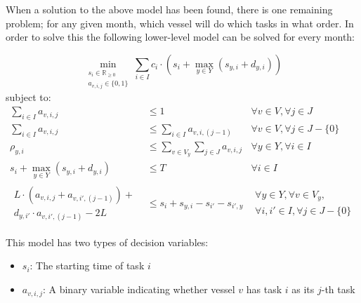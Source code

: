 \documentclass[a4paper,12pt]{article}
\begin{document}
When a solution to the above model has been found, there is one remaining problem; for any given month, which vessel will do which tasks in what order. In order to solve this the following lower-level model can be solved for every month:

\begin{adjustwidth}{-2.5cm}{-2.5cm}
\begin{equation}
	\min_{\substack{s_i \in \mathbb{R}_{\geq 0} \\ 
	a_{v,i,j} \in \{0, 1\}}} 
	\sum_{i \in I} c_i \cdot (s_i + \max_{y \in Y} (s_{y,i}+ d_{y,i}))
\end{equation}
subject to:
\begin{align}
\sum_{i \in I} a_{v,i,j}						&\leq 		1							& \forall v \in V, \forall j \in J 						\\
\sum_{i \in I} a_{v,i,j}						&\leq 		\sum_{i \in I} a_{v,i,(j-1)}				& \forall v \in V, \forall j \in J - \{ 0 \}					\\
\rho_{y,i}								&\leq	 	\sum_{v \in V_y} \sum_{j \in J} a_{v,i,j} 	& \forall y \in Y, \forall i \in I						\\
s_i + \max_{y \in Y} (s_{y,i}+ d_{y,i})				&\leq		T 							&\forall i \in I 								\\	
\begin{aligned} L \cdot (a_{v,i,j} + a_{v,i',(j-1)}) + \\ 
d_{y,i'} \cdot a_{v,i',(j-1)} - 2L \end{aligned}			&\leq	 	s_i + s_{y,i} - s_{i'} - s_{i',y}			& \begin{aligned} \forall y \in Y, \forall v \in V_y, 			\\
																		\forall i, i' \in I, \forall j \in J - \{ 0 \}	\end{aligned}		
\end{align}
\end{adjustwidth}

This model has two types of decision variables:

\begin{itemize}
\item $s_i$: The starting time of task $i$
\item $a_{v,i,j}$: A binary variable indicating whether vessel $v$ has task $i$ as its $j$-th task
\end{itemize}
\end{document}
